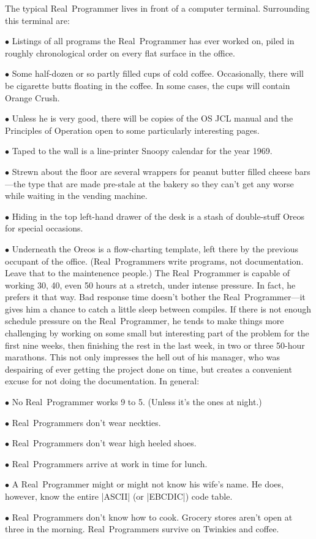The typical Real~Programmer lives in front of a computer terminal. Surrounding this terminal are:
\startlist
\item{$\bullet$} Listings of all programs the Real~Programmer has ever worked on, piled in roughly chronological order on every flat surface in the office.
\item{$\bullet$} Some half-dozen or so partly filled cups of cold coffee. Occasionally, there will be cigarette butts floating in the coffee. In some cases, the cups will contain Orange Crush.
\item{$\bullet$} Unless he is very good, there will be copies of the OS JCL manual and the Principles of Operation open to some particularly interesting pages.
\item{$\bullet$} Taped to the wall is a line-printer Snoopy calendar for the year 1969.
\item{$\bullet$} Strewn about the floor are several wrappers for peanut butter filled cheese bars---the type that are made pre-stale at the bakery so they can't get any worse while waiting in the vending machine.
\item{$\bullet$} Hiding in the top left-hand drawer of the desk is a stash of double-stuff Oreos for special occasions.
\item{$\bullet$} Underneath the Oreos is a flow-charting template, left there by the previous occupant of the office. (Real~Programmers write programs, not documentation. Leave that to the maintenence people.)
\endlist
The Real~Programmer is capable of working 30, 40, even 50 hours at a
stretch, under intense pressure. In fact, he prefers it that way. Bad
response time doesn't bother the Real~Programmer---it gives him a
chance to catch a little sleep between compiles. If there is not
enough schedule pressure on the Real~Programmer, he tends to make
things more challenging by working on some small but interesting part
of the problem for the first nine weeks, then finishing the rest in
the last week, in two or three 50-hour marathons. This not only
impresses the hell out of his manager, who was despairing of ever
getting the project done on time, but creates a convenient excuse for
not doing the documentation. In general:
\startlist
\item{$\bullet$} No Real~Programmer works 9 to 5. (Unless it's the ones at night.)
\item{$\bullet$} Real~Programmers don't wear neckties.
\item{$\bullet$} Real~Programmers don't wear high heeled shoes.
\item{$\bullet$} Real~Programmers arrive at work in time for lunch.
\item{$\bullet$} A Real~Programmer might or might not know his wife's name. He does, however, know the entire |ASCII| (or |EBCDIC|) code table.
\item{$\bullet$} Real~Programmers don't know how to cook. Grocery stores aren't open at three in the morning. Real~Programmers survive on Twinkies and coffee.
\endlist

